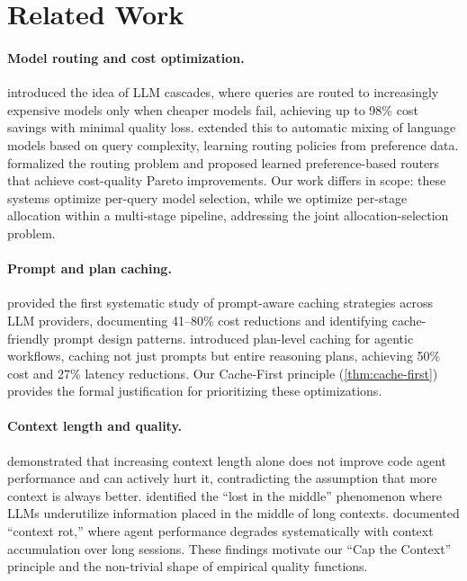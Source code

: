 \documentclass[11pt, a4paper, copyright]{googledeepmind}
\begin{document}
\section{Related Work}\label{sec:related}

\paragraph{Model routing and cost optimization.}
\citet{chen2023frugalgpt} introduced the idea of LLM cascades, where queries are routed to increasingly expensive models only when cheaper models fail, achieving up to 98\% cost savings with minimal quality loss. \citet{madaan2024automix} extended this to automatic mixing of language models based on query complexity, learning routing policies from preference data. \citet{ong2024routellm} formalized the routing problem and proposed learned preference-based routers that achieve cost-quality Pareto improvements. Our work differs in scope: these systems optimize per-query model selection, while we optimize per-stage allocation within a multi-stage pipeline, addressing the joint allocation-selection problem.

\paragraph{Prompt and plan caching.}
\citet{liang2026cache} provided the first systematic study of prompt-aware caching strategies across LLM providers, documenting 41--80\% cost reductions and identifying cache-friendly prompt design patterns. \citet{zhang2025plancache} introduced plan-level caching for agentic workflows, caching not just prompts but entire reasoning plans, achieving 50\% cost and 27\% latency reductions. Our Cache-First principle (\cref{thm:cache-first}) provides the formal justification for prioritizing these optimizations.

\paragraph{Context length and quality.}
\citet{gao2025context} demonstrated that increasing context length alone does not improve code agent performance and can actively hurt it, contradicting the assumption that more context is always better. \citet{liu2024lost} identified the ``lost in the middle'' phenomenon where LLMs underutilize information placed in the middle of long contexts. \citet{chroma2025rot} documented ``context rot,'' where agent performance degrades systematically with context accumulation over long sessions. These findings motivate our ``Cap the Context'' principle and the non-trivial shape of empirical quality functions.
\end{document}
